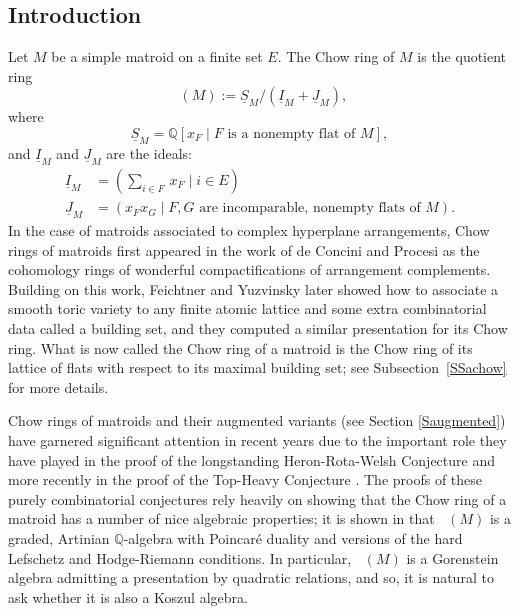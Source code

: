 \documentclass[11pt, reqno]{amsart}
\DeclareMathOperator{\Chow}{\underline{CH}}		%
\newcommand{\QQ}{\mathbb{Q}}
\theoremstyle{definition}
\numberwithin{equation}{section}
\numberwithin{table}{section}
\begin{document}
\begin{spacing}{1.1}

\section{Introduction}

Let $M$ be a simple matroid on a finite set $E$.  The Chow ring of $M$ is the quotient ring
\[\Chow(M) := \underline{S}_M/(\underline{I}_M + \underline{J}_M),\]
where
\[\underline{S}_M = \QQ[x_F \mid F \text{ is a nonempty flat of } M],\]
and $\underline{I}_M$ and $\underline{J}_M$ are the ideals:
\begin{align*}
\underline{I}_M &= ({\textstyle \sum_{i \in F}} \, x_F \mid i \in E)\\[1 ex]
\underline{J}_M &= \left(x_Fx_G \mid F,G \text{ are incomparable, nonempty flats of } M\right).
\end{align*}
In the case of matroids associated to complex hyperplane arrangements, Chow rings of matroids first appeared in the work of de Concini and Procesi \cite{DP95a} as the cohomology rings of wonderful compactifications of arrangement complements.  Building on this work, Feichtner and Yuzvinsky \cite{FY04} later showed how to associate a smooth toric variety to any finite atomic lattice and some extra combinatorial data called a building set, and they computed a similar presentation for its Chow ring.  What is now called the Chow ring of a matroid is the Chow ring of its lattice of flats with respect to its maximal building set; see Subsection~\ref{SSachow} for more details. %

Chow rings of matroids and their augmented variants (see Section \ref{Saugmented}) have garnered significant attention in recent years due to the important role they have played in the proof of the longstanding Heron-Rota-Welsh Conjecture \cite{AHK18} and more recently in the proof of the Top-Heavy Conjecture \cite{BHMPW20b}.  The proofs of these purely combinatorial conjectures rely heavily on showing that the Chow ring of a matroid has a number of nice algebraic properties; it is shown in \cite{AHK18} that $\Chow(M)$ is a graded, Artinian $\QQ$-algebra with Poincar\'{e} duality and versions of the hard Lefschetz and Hodge-Riemann conditions.  In particular, $\Chow(M)$ is a Gorenstein algebra admitting a presentation by quadratic relations, and so, it is natural to ask whether it is also a Koszul algebra. 


\end{spacing}
\end{document}
